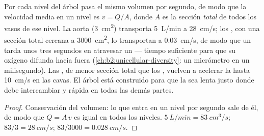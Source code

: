 \begin{theorem}\label{thm:b2:blood-circulation:continuity}
Por cada nivel del árbol pasa el mismo volumen por segundo, de modo que la
velocidad media en un nivel es $v = Q/A$, donde $A$ es la sección
\emph{total} de todos los vasos de ese nivel. La aorta
(\qty{3}{cm^2}) transporta \qty{5}{L/min} a \qty{28}{cm/s}; los
, con una sección total cercana a \qty{3000}{cm^2}, lo
transportan a \qty{0.03}{cm/s}, de modo que un  tarda unos tres
segundos en atravesar un  --- tiempo suficiente para que su
oxígeno difunda hacia fuera (\cref{ch:b2:unicellular-diversity}: un
micrómetro en un milisegundo). Las , de menor sección total que los
, vuelven a acelerar la  hasta \qty{10}{cm/s} en las 
cavas. El árbol está construido para que la  sea lenta justo donde
debe intercambiar y rápida en todas las demás partes.
\end{theorem}
\begin{proof}
Conservación del volumen: lo que entra en un nivel por segundo sale de él,
de modo que $Q = A\,v$ es igual en todos los niveles. $\qty{5}{L/min} =
\qty{83}{cm^3/s}$; $83/3 = \qty{28}{cm/s}$; $83/3000 =
\qty{0.028}{cm/s}$.
\end{proof}

